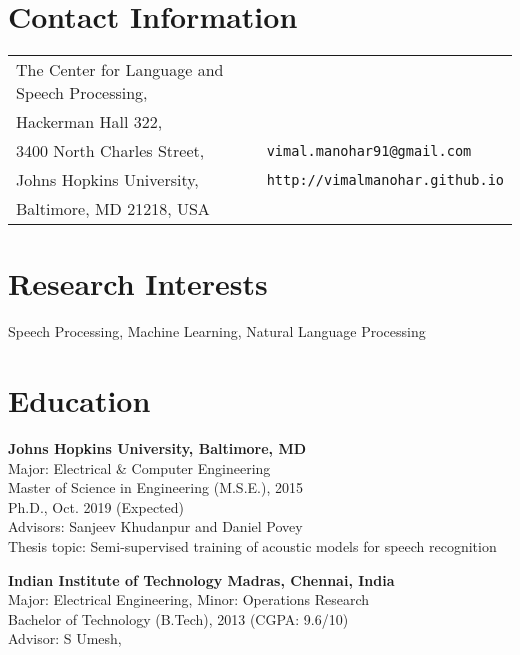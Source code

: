 \documentclass[margin,line,pifont,palatino,courier]{res}
\begin{document}

\begin{resume}

\section{\sc Contact Information}

\vspace{.05in}
\begin{tabular}{l l}
The Center for Language and Speech Processing, \\
Hackerman Hall 322,\\
3400 North Charles Street,                        & \verb+vimal.manohar91@gmail.com+\\
Johns Hopkins University,                  & \verb+http://vimalmanohar.github.io+\\
Baltimore, MD 21218, USA               & \\
\end{tabular}

\section{\sc Research Interests}
Speech Processing, Machine Learning, Natural Language Processing

\section{\sc Education}

\textbf{Johns Hopkins University, Baltimore, MD} \\
Major: Electrical \& Computer Engineering \\
Master of Science in Engineering (M.S.E.), 2015\\
Ph.D., Oct. 2019 (Expected) \\
Advisors: Sanjeev Khudanpur and Daniel Povey \\
Thesis topic: Semi-supervised training of acoustic models for speech recognition

\textbf{Indian Institute of Technology Madras, Chennai, India} \\
Major: Electrical Engineering, \quad Minor: Operations Research \\
Bachelor of Technology (B.Tech), 2013 (CGPA: 9.6/10) \\
Advisor: S Umesh, \\


\end{resume}
\end{document}
